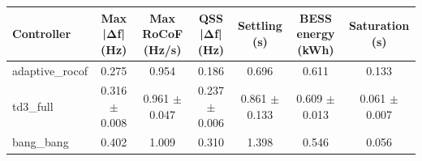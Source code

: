\begin{tabular}{lcccccc}
\toprule
Controller & Max |Δf| (Hz) & Max RoCoF (Hz/s) & QSS |Δf| (Hz) & Settling (s) & BESS energy (kWh) & Saturation (s) \\
\midrule
adaptive\_rocof & 0.275 & 0.954 & 0.186 & 0.696 & 0.611 & 0.133 \\
td3\_full & 0.316 $\pm$ 0.008 & 0.961 $\pm$ 0.047 & 0.237 $\pm$ 0.006 & 0.861 $\pm$ 0.133 & 0.609 $\pm$ 0.013 & 0.061 $\pm$ 0.007 \\
bang\_bang & 0.402 & 1.009 & 0.310 & 1.398 & 0.546 & 0.056 \\
\bottomrule
\end{tabular}